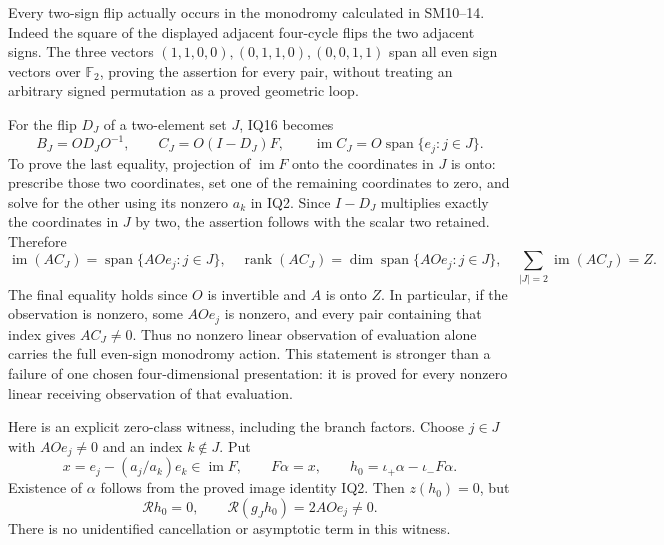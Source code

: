 \documentclass[11pt]{article}
\newcommand{\im}{\operatorname{im}}
\newcommand{\rank}{\operatorname{rank}}
\newcommand{\Span}{\operatorname{span}}
\begin{document}
Every two-sign flip actually occurs in the monodromy calculated in
SM10--14.  Indeed the square of the displayed adjacent four-cycle flips
the two adjacent signs.  The three vectors $(1,1,0,0),(0,1,1,0),(0,0,1,1)$
span all even sign vectors over $\mathbb F_2$, proving the assertion for
every pair, without treating an arbitrary signed permutation as a proved
geometric loop.

For the flip $D_J$ of a two-element set $J$, IQ16 becomes
\[
 B_J=OD_JO^{-1},\qquad
 C_J=O(I-D_J)F,
 \qquad \im C_J=O\Span\{e_j:j\in J\}.              \tag{IQ19}
\]
To prove the last equality, projection of $\im F$ onto the coordinates in
$J$ is onto: prescribe those two coordinates, set one of the remaining
coordinates to zero, and solve for the other using its nonzero $a_k$ in
IQ2.  Since $I-D_J$ multiplies exactly the coordinates in $J$ by two,
the assertion follows with the scalar two retained.  Therefore
\[
 \im(AC_J)=\Span\{AOe_j:j\in J\},\quad
 \rank(AC_J)=\dim\Span\{AOe_j:j\in J\},\quad
 \sum_{|J|=2}\im(AC_J)=Z.                            \tag{IQ20}
\]
The final equality holds since $O$ is invertible and $A$ is onto $Z$.
In particular, if the observation is nonzero, some $AOe_j$ is nonzero,
and every pair containing that index gives $AC_J\ne0$.  Thus no nonzero
linear observation of evaluation alone carries the full even-sign
monodromy action.  This statement is stronger than a failure of one
chosen four-dimensional presentation: it is proved for every nonzero
linear receiving observation of that evaluation.

Here is an explicit zero-class witness, including the branch factors.
Choose $j\in J$ with $AOe_j\ne0$ and an index $k\notin J$.  Put
\[
 x=e_j-(a_j/a_k)e_k\in\im F,\qquad
 F\alpha=x,\qquad
 h_0=\iota_+\alpha-\iota_-F\alpha.                 \tag{IQ21}
\]
Existence of $\alpha$ follows from the proved image identity IQ2.
Then $z(h_0)=0$, but
\[
 \mathcal Rh_0=0,\qquad
 \mathcal R(g_Jh_0)=2AOe_j\ne0.                    \tag{IQ22}
\]
There is no unidentified cancellation or asymptotic term in this witness.
\end{document}
